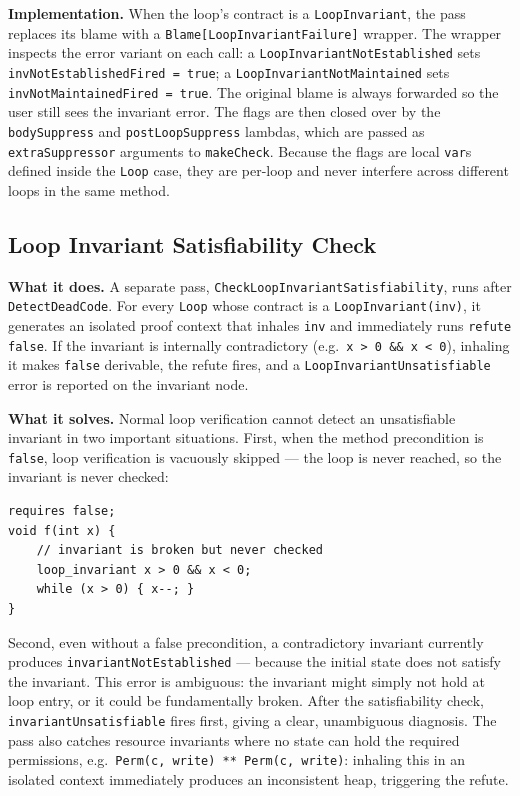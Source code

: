 \documentclass[9pt,a4paper,twocolumn]{article}
\begin{document}
\textbf{Implementation.} When the loop's contract is a
\texttt{LoopInvariant}, the pass replaces its blame with a
\texttt{Blame[LoopInvariantFailure]} wrapper. The wrapper inspects
the error variant on each call: a
\texttt{LoopInvariantNotEstablished} sets
\texttt{invNotEstablishedFired = true}; a
\texttt{LoopInvariantNotMaintained} sets
\texttt{invNotMaintainedFired = true}. The original blame is always
forwarded so the user still sees the invariant error. The flags are
then closed over by the \texttt{bodySuppress} and
\texttt{postLoopSuppress} lambdas, which are passed as
\texttt{extraSuppressor} arguments to \texttt{makeCheck}. Because
the flags are local \texttt{var}s defined inside the
\texttt{Loop} case, they are per-loop and never interfere across
different loops in the same method.

\subsection{Loop Invariant Satisfiability Check}

\textbf{What it does.} A separate pass,
\texttt{CheckLoopInvariantSatisfiability}, runs after
\texttt{DetectDeadCode}. For every \texttt{Loop} whose contract is
a \texttt{LoopInvariant(inv)}, it generates an isolated proof
context that inhales \texttt{inv} and immediately runs
\texttt{refute false}. If the invariant is internally contradictory
(e.g.\ \texttt{x > 0 \&\& x < 0}), inhaling it makes
\texttt{false} derivable, the refute fires, and a
\texttt{LoopInvariantUnsatisfiable} error is reported on the
invariant node.

\textbf{What it solves.} Normal loop verification cannot detect an
unsatisfiable invariant in two important situations. First, when
the method precondition is \texttt{false}, loop verification is
vacuously skipped — the loop is never reached, so the invariant is
never checked:

\begin{lstlisting}
requires false;
void f(int x) {
    // invariant is broken but never checked
    loop_invariant x > 0 && x < 0;
    while (x > 0) { x--; }
}
\end{lstlisting}

Second, even without a false precondition, a contradictory
invariant currently produces \texttt{invariantNotEstablished} —
because the initial state does not satisfy the invariant. This
error is ambiguous: the invariant might simply not hold at loop
entry, or it could be fundamentally broken. After the
satisfiability check, \texttt{invariantUnsatisfiable} fires first,
giving a clear, unambiguous diagnosis. The pass also catches
resource invariants where no state can hold the required
permissions, e.g.\ \texttt{Perm(c, write) ** Perm(c, write)}:
inhaling this in an isolated context immediately produces an
inconsistent heap, triggering the refute.
\end{document}
